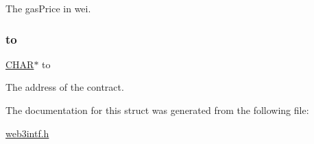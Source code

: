The gas\+Price in wei. 

\mbox{\label{struct_t_param__eth__call_addbf2c889591864d4b2334493e6a3041}} 
\subsubsection{\texorpdfstring{to}{to}}
{\footnotesize\ttfamily \mbox{\hyperlink{boattypes_8h_aebb9e13210d88d43e32e735ada43a425}{C\+H\+AR}}$\ast$ to}



The address of the contract. 



The documentation for this struct was generated from the following file\+:\begin{DoxyCompactItemize}
\item 
\mbox{\hyperlink{web3intf_8h}{web3intf.\+h}}\end{DoxyCompactItemize}
